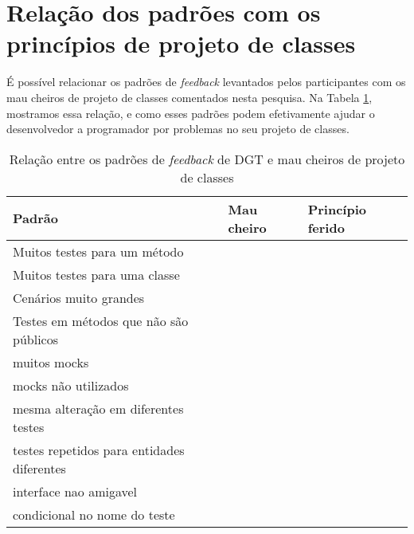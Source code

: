 \section{Relação dos padrões com os princípios de projeto de classes}

É possível relacionar os padrões de \textit{feedback} levantados pelos participantes
com os mau cheiros de projeto de classes comentados nesta pesquisa. Na Tabela \ref{tab:relacao-padroes},
mostramos essa relação, e como esses padrões podem efetivamente ajudar o desenvolvedor
a programador por problemas no seu projeto de classes.


\begin{table}[h!]
	\centering
	\begin{tabular}{| p{5cm} | p{5cm} | p{5cm} | }
		\hline

		Padrão & Mau cheiro & Princípio ferido\\
		
		\hline

		Muitos testes para um método                   & & \\
		Muitos testes para uma classe                  & & \\
		Cenários muito grandes                         & & \\
		Testes em métodos que não são públicos         & & \\
		muitos mocks                                   & & \\
		mocks não utilizados                           & & \\
		mesma alteração em diferentes testes           & & \\
		testes repetidos para entidades diferentes     & & \\
		interface nao amigavel                         & & \\
		condicional no nome do teste                   & & \\

		\hline
		
	\end{tabular}
	\caption{Relação entre os padrões de \textit{feedback} de DGT e mau cheiros de projeto de classes}
	\label{tab:relacao-padroes}
\end{table}
